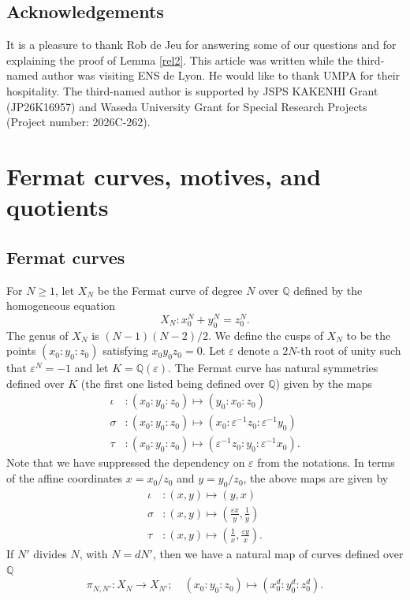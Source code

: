 \documentclass[11pt,a4,leqno]{amsart}
\theoremstyle{my theoremstyle}
\theoremstyle{dfn}
\theoremstyle{remark}
\renewcommand{\1}{\mathbbm{1}}
\newcommand{\Q}{\mathbb{Q}}
\newcommand{\e}{\varepsilon}
\numberwithin{equation}{section}
\begin{document}
\subsection*{Acknowledgements} It is a pleasure to thank Rob de Jeu for answering some of our questions and for explaining the proof of Lemma \ref{rel2}.
This article was written while the third-named author was visiting ENS de Lyon. He would like to thank UMPA for their hospitality. 
The third-named author is supported by JSPS KAKENHI Grant (JP26K16957) and Waseda University Grant for Special Research Projects (Project number: 2026C-262). 

\section{Fermat curves, motives, and quotients} \label{s:fermat}
\subsection{Fermat curves}
For $N\geq 1$, let $X_N$ be the Fermat curve of degree $N$ over $\Q$ defined by the homogeneous equation 
$$X_N \colon x_0^N+ y_0^N=z_0^N. $$
The genus of $X_N$ is $(N-1)(N-2)/2$. We define the cusps of $X_N$ to be the points $(x_0:y_0:z_0)$ satisfying $x_0 y_0 z_0 = 0$. 
Let $\varepsilon$ denote a $2N$-th root of unity such that $\varepsilon^N=-1$ and let $K=\Q(\varepsilon)$.
The Fermat curve has natural symmetries defined over $K$ (the first one listed being defined over $\Q$) given by the maps 
\begin{align*}
\iota & \colon (x_0 : y_0 : z_0) \longmapsto (y_0 : x_0 : z_0) \\
\sigma & \colon (x_0 : y_0 : z_0) \longmapsto (x_0 : \varepsilon^{-1} z_0 : \varepsilon^{-1} y_0) \\
\tau & \colon (x_0 : y_0 : z_0) \longmapsto (\varepsilon^{-1} z_0 : y_0 : \varepsilon^{-1} x_0).
\end{align*}
Note that we have suppressed the dependency on $\e$ from the notations.
In terms of the affine coordinates $x=x_0/z_0$ and $y=y_0/z_0$, the above maps are given by
\begin{align} \label{sym:1}
\iota & \colon (x,y) \longmapsto (y, x) \\ \label{sym:2} 
\sigma & \colon (x,y) \longmapsto \left(\frac{\varepsilon x}{y}, \frac{1}{y} \right) \\  \label{sym:3}
\tau & \colon (x,y) \longmapsto \left(\frac{1}{x}, \frac{\varepsilon y}{x} \right). 
\end{align}
If $N'$ divides $N$, with $N = dN'$, then we have a natural map of curves defined over $\Q$
\begin{equation}\label{map:divideN}
    \pi_{N, N'} \colon X_N \longrightarrow X_{N'}; \quad (x_0 : y_0 : z_0) \longmapsto (x_0^d : y_0^d : z_0^d). 
\end{equation}
\end{document}
